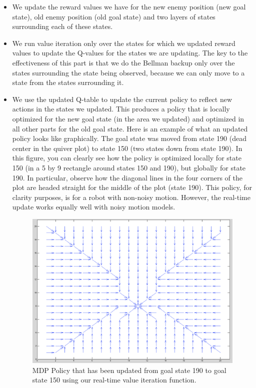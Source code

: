 \documentclass{aiaa-tc}%
\begin{document}
\begin{itemize}
\item We update the reward values we have for the new enemy position (new goal state), old enemy position (old goal state) and two layers of states surrounding each of these states.
\item We run value iteration only over the states for which we updated reward values to update the Q-values for the states we are updating. The key to the effectiveness of this part is that we do the Bellman backup only over the states surrounding the state being observed, because we can only move to a state from the states surrounding it.
\item We use the updated Q-table to update the current policy to reflect new actions in the states we updated. 
This produces a policy that is locally optimized for the new goal state (in the area we updated) and optimized in all other parts for the old goal state. Here is an example of what an updated policy looks like graphically. The goal state was moved from state 190 (dead center in the quiver plot) to state 150 (two states down from state 190). In this figure, you can clearly see how the policy is optimized locally for state 150 (in a 5 by 9 rectangle around states 150 and 190), but globally for state 190. In particular, observe how the diagonal lines in the four corners of the plot are headed straight for the middle of the plot (state 190). This policy, for clarity purposes, is for a robot with non-noisy motion. However, the real-time update works equally well with noisy motion models.
 \begin{figure}[htbp]
   \centering
   \includegraphics[width=170mm]{mdp_update_190_150.png} 
   \caption{MDP Policy that has been updated from goal state 190 to goal state 150 using our real-time value iteration function.}
   \label{fig:sample}
\end{figure}
\clearpage
\end{itemize}
\end{document}
